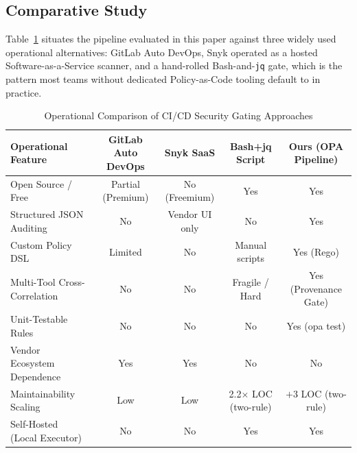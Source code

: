 \documentclass[conference]{IEEEtran}
\begin{document}
\subsection{Comparative Study}
\label{subsec:comparative}
Table~\ref{tab:comparative_study} situates the pipeline evaluated in this paper against three widely used operational alternatives: GitLab Auto DevOps, Snyk operated as a hosted Software-as-a-Service scanner, and a hand-rolled Bash-and-\texttt{jq} gate, which is the pattern most teams without dedicated Policy-as-Code tooling default to in practice.

\begin{table}[t]
\centering
\caption{Operational Comparison of CI/CD Security Gating Approaches}
\label{tab:comparative_study}
\footnotesize
\begin{tabular}{|l|c|c|c|c|}
\hline
\textbf{Operational Feature} & \textbf{GitLab Auto DevOps} & \textbf{Snyk SaaS} & \textbf{Bash+jq Script} & \textbf{Ours (OPA Pipeline)} \\
\hline
Open Source / Free           & Partial (Premium)  & No (Freemium) & Yes & Yes \\
Structured JSON Auditing     & No                 & Vendor UI only & No  & Yes \\
Custom Policy DSL            & Limited            & No             & Manual scripts & Yes (Rego) \\
Multi-Tool Cross-Correlation & No                 & No             & Fragile / Hard & Yes (Provenance Gate) \\
Unit-Testable Rules          & No                 & No             & No  & Yes (opa test) \\
Vendor Ecosystem Dependence  & Yes                & Yes            & No  & No \\

Maintainability Scaling      & Low                & Low            & 2.2$\times$ LOC (two-rule) & $+3$ LOC (two-rule) \\
Self-Hosted (Local Executor) & No                 & No             & Yes & Yes \\
\hline
\end{tabular}
\end{table}
\end{document}
